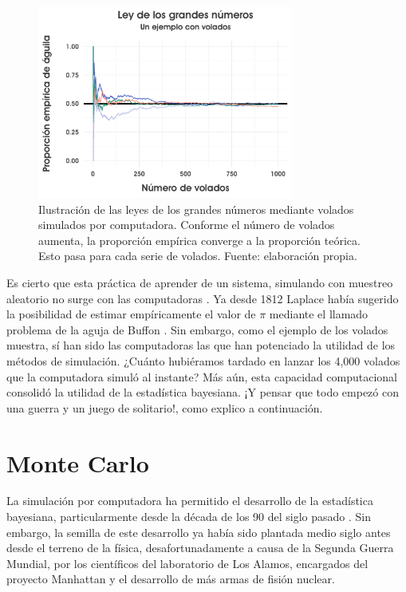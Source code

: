 \begin{figure}[h]
	\centering
	\includegraphics[width=0.75\textwidth]{Figs/Bayes/LGN}
	\caption{Ilustración de las leyes de los grandes números mediante volados simulados por computadora. Conforme el número de volados aumenta, la proporción empírica converge a la proporción teórica. Esto pasa para cada serie de volados. Fuente: elaboración propia.}
	\label{fig:LGN}	
\end{figure}

Es cierto que esta práctica de aprender de un sistema, simulando con muestreo aleatorio no surge con las computadoras \parencite{Owen13}. Ya desde 1812 Laplace había sugerido la posibilidad de estimar empíricamente el valor de $\pi$ mediante el llamado problema de la aguja de Buffon \parencite{Ragheb13}. Sin embargo, como el ejemplo de los volados muestra, sí han sido las computadoras las que han potenciado la utilidad de los métodos de simulación. ¿Cuánto hubiéramos tardado en lanzar los 4,000 volados que la computadora simuló al instante? Más aún, esta capacidad computacional consolidó la utilidad de la estadística bayesiana. ¡Y pensar que todo empezó con una guerra y un juego de solitario!, como explico a continuación.

\section{Monte Carlo} 

La simulación por computadora ha permitido el desarrollo de la estadística bayesiana, particularmente desde la década de los 90 del siglo pasado \parencite{RobertCasella11}. Sin embargo, la semilla de este desarrollo ya había sido plantada medio siglo antes desde el terreno de la física, desafortunadamente a causa de la Segunda Guerra Mundial, por los científicos del laboratorio de Los Alamos, encargados del proyecto Manhattan y el desarrollo de más armas de fisión nuclear.\\

